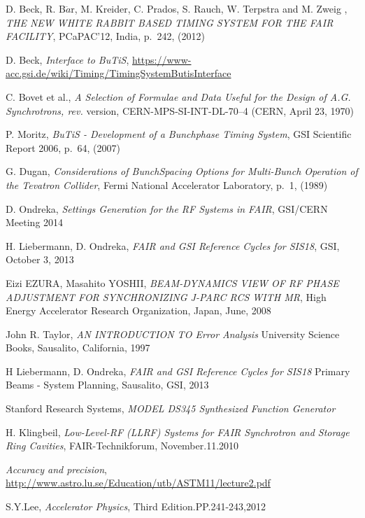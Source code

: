 \begin{thebibliography}{99} 

	D. Beck, R. B$\ddot{a}$r, M. Kreider, C. Prados, S. Rauch, W. Terpstra and M. Zweig ,
	\textit{THE NEW WHITE RABBIT BASED TIMING SYSTEM FOR THE FAIR FACILITY},
	PCaPAC'12, India, p.~242, (2012)

	D. Beck, 
     \textit{Interface to BuTiS},
	\url{https://www-acc.gsi.de/wiki/Timing/TimingSystemButisInterface}

	C. Bovet et al.,
     \textit{A Selection of Formulae and Data Useful for the Design of A.G. Synchrotrons,
rev.}
	version, CERN-MPS-SI-INT-DL-70–4 (CERN, April 23, 1970)

	P. Moritz,
	\textit{BuTiS - Development of a Bunchphase Timing System},
	GSI Scientific Report 2006, p.~64, (2007)

	G. Dugan,
	\textit{Considerations of BunchSpacing Options for Multi-Bunch Operation of the Tevatron Collider},
	Fermi National Accelerator Laboratory, p.~1, (1989)


     D. Ondreka,
	\textit{Settings Generation for the RF Systems in FAIR},
	GSI/CERN Meeting 2014

     H. Liebermann, D. Ondreka,
	\textit{FAIR and GSI Reference Cycles for SIS18},
	GSI, October 3, 2013

     Eizi EZURA, Masahito YOSHII,
	\textit{BEAM-DYNAMICS VIEW OF RF PHASE ADJUSTMENT FOR SYNCHRONIZING J-PARC RCS WITH MR},
	High Energy Accelerator Research Organization, Japan, June, 2008

    John R. Taylor,
    \textit{AN INTRODUCTION TO Error Analysis} 
    University Science Books, Sausalito, California, 1997

    H Liebermann, D. Ondreka,
    \textit{FAIR and GSI Reference Cycles for SIS18} 
    Primary Beams - System Planning, Sausalito, GSI, 2013 

     Stanford Research Systems,
	\textit{MODEL DS345 Synthesized Function Generator}

      H. Klingbeil,
      \textit{Low-Level-RF (LLRF) Systems for FAIR Synchrotron and Storage Ring Cavities},
      FAIR-Technikforum, November.11.2010

     \textit{Accuracy and precision},
	\url{http://www.astro.lu.se/Education/utb/ASTM11/lecture2.pdf}

      S.Y.Lee,
      \textit{Accelerator 	Physics},
      Third Edition.PP.241-243,2012 
\addtocounter{enumi}{10}


\end{thebibliography}



